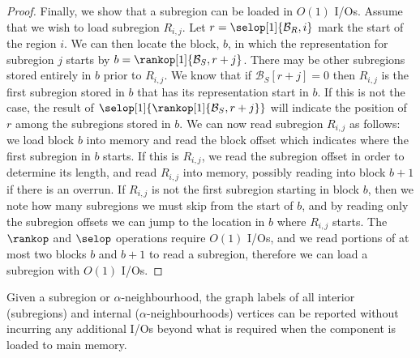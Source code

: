 \begin{proof}
  Finally, we show that a subregion can be loaded in $O(1)$
  I/Os. 
  Assume that  we wish to load subregion $R_{i,j}$. 
  Let $r = \selop[1]{\mathcal{B}_R,i}$ mark the start of the region $i$. 
  We can then locate the block, $b$, in which the representation for
  subregion $j$ starts by $b=\rankop[1]{\mathcal{B}_S, r+j}$. 
  There may be other subregions stored entirely in $b$ prior to
  $R_{i,j}$. 
  We know that if $\mathcal{B}_S[r+j] = 0$ then $R_{i,j}$ is the
  first subregion stored in $b$ that has its representation start in
  $b$.  
  If this is not the case, the result of
  $\selop[1]{\rankop[1]{\mathcal{B}_S,r+j}}$ will indicate the position
  of $r$ among the subregions stored in $b$.  
  We can now read
  subregion $R_{i,j}$ as follows: 
  we load block $b$ into memory and
  read the block offset which indicates where the first subregion in
  $b$ starts. 
  If this is $R_{i,j}$, we read the subregion offset in order to
  determine its length, and read $R_{i,j}$ into memory, possibly
  reading into block $b+1$ if there is an overrun. 
  If $R_{i,j}$ is not
  the first subregion starting in block $b$, then we note how many
  subregions we must skip from the start of $b$, and by reading only
  the subregion offsets we can jump to the location in $b$ where
  $R_{i,j}$ starts. 
  The $\rankop$ and $\selop$ operations require
  $O(1)$ I/Os, and we read portions of at most two blocks $b$ and
  $b+1$ to read a subregion, therefore we can load a subregion with $O(1)$
  I/Os.
\end{proof}


\begin{lemma}
  \label{lem:report_int_labels}
  Given a subregion or $\alpha$-neighbourhood, the graph labels of
  all interior (subregions) and internal ($\alpha$-neighbourhoods)
  vertices can be reported without incurring any additional I/Os
  beyond what is required when the component is loaded to main memory.
\end{lemma}

